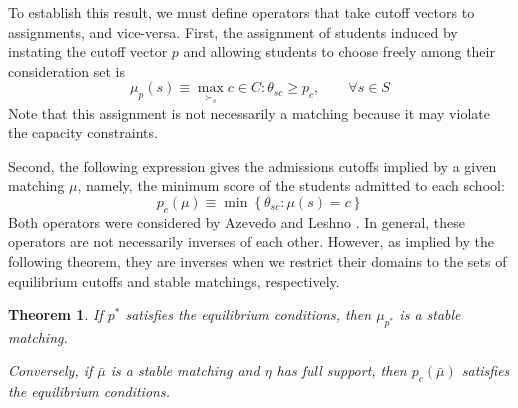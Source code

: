 \documentclass[12pt]{article}
\numberwithin{equation}{subsection}
\newtheorem{theorem}{Theorem}
\theoremstyle{definition}
\begin{document}
To establish this result, we must define operators that take cutoff vectors to assignments, and vice-versa. First, the assignment of students induced by instating the cutoff vector $p$ and allowing students to choose freely among their consideration set is
\[\mu_p(s) \equiv \max_{\succ_s} c \in C : \theta_{sc} \geq p_c, \qquad \forall s \in S\] 
Note that this assignment is not necessarily a matching because it may violate the capacity constraints. 

Second, the following expression gives the admissions cutoffs implied by a given matching $\mu$, namely, the minimum score of the students admitted to each school:
\[p_c(\mu) \equiv \min \left\{\theta_{sc}: \mu(s) = c\right\}\]
Both operators were considered by Azevedo and Leshno \parencite*{supplydemandfw}. In general, these operators are not necessarily inverses of each other. However, as implied by the following theorem, they are inverses when we restrict their domains to the sets of equilibrium cutoffs and stable matchings, respectively. 

\begin{theorem}If $p^*$ satisfies the equilibrium conditions, then $\mu_{p^*}$ is a stable matching. 

Conversely, if $\bar \mu$ is a stable matching and $\eta$ has full support, then $p_c(\bar \mu)$ satisfies the equilibrium conditions. \end{theorem}
\end{document}
